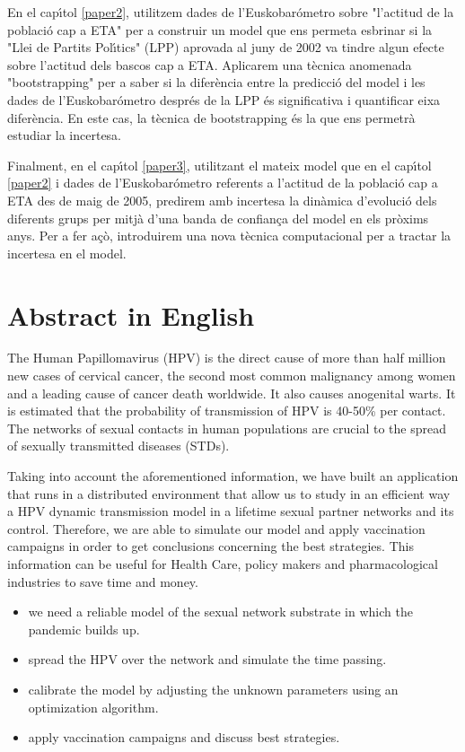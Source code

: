 En el cap\'{\i}tol \ref{paper2}, utilitzem dades de l'Euskobar\'ometro sobre "l'actitud de la poblaci\'o cap a ETA" per a construir un model que ens permeta esbrinar si la "Llei de Partits Pol\'{\i}tics" (LPP) aprovada al juny de 2002 va tindre algun efecte sobre l'actitud dels bascos cap a ETA. Aplicarem una t\`ecnica anomenada "bootstrapping" per a saber si la difer\`encia entre la predicci\'o del model i les dades de l'Euskobar\'ometro despr\'es de la LPP \'es significativa i quantificar eixa difer\`encia. En este cas, la t\`ecnica de bootstrapping \'es la que ens permetr\`a estudiar la incertesa.

Finalment, en el cap\'{\i}tol \ref{paper3}, utilitzant el mateix model que en el cap\'{\i}tol \ref{paper2} i dades de l'Euskobar\'ometro referents a l'actitud de la poblaci\'o cap a ETA des de maig de 2005, predirem amb incertesa la din\`amica d'evoluci\'o dels diferents grups per mitj\`a d'una banda de confian\c ca del model en els pr\`oxims anys. Per a fer a\c c\`o, introduirem una nova t\`ecnica computacional per a tractar la incertesa en el model.


\chapter*{Abstract in English}
The Human Papillomavirus (HPV) is the direct cause of more than half million new cases of cervical cancer, the second most common malignancy among women and a leading cause of cancer death worldwide. It also causes anogenital warts. It is estimated that the probability of transmission of HPV is 40-50\% per contact. The networks of sexual contacts in human populations are crucial to the spread of sexually transmitted diseases (STDs).

Taking into account the aforementioned information, we have built an application that runs in a distributed environment that allow us to study in an efficient way a HPV dynamic transmission model in a lifetime sexual partner networks and its control. Therefore, we are able to simulate our model and apply  vaccination campaigns in order to get conclusions concerning the best strategies. This information can be useful for Health Care, policy makers and pharmacological industries to save time and money.

\begin{itemize}
\item we need a reliable model
of the sexual network substrate in which the pandemic builds up.
\item spread the HPV over the network and simulate the time passing.
\item calibrate the model by adjusting the unknown parameters using an optimization algorithm.
\item apply vaccination campaigns and discuss best strategies.
\end{itemize}

